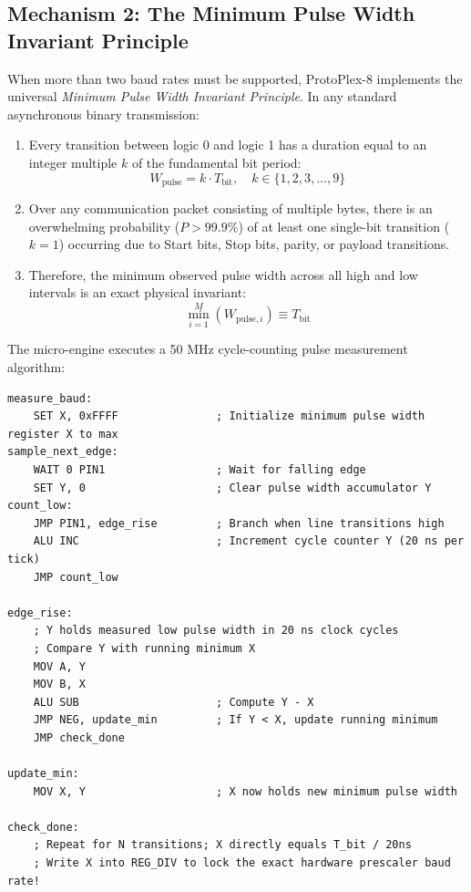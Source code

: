 \documentclass[11pt,a4paper]{article}
\begin{document}
\subsection{Mechanism 2: The Minimum Pulse Width Invariant Principle}
When more than two baud rates must be supported, ProtoPlex-8 implements the universal \textit{Minimum Pulse Width Invariant Principle}. In any standard asynchronous binary transmission:
\begin{enumerate}
    \item Every transition between logic 0 and logic 1 has a duration equal to an integer multiple $k$ of the fundamental bit period:
    \begin{equation}
        W_{\text{pulse}} = k \cdot T_{\text{bit}}, \quad k \in \{1, 2, 3, \dots, 9\}
    \end{equation}
    \item Over any communication packet consisting of multiple bytes, there is an overwhelming probability ($P > 99.9\%$) of at least one single-bit transition ($k=1$) occurring due to Start bits, Stop bits, parity, or payload transitions.
    \item Therefore, the minimum observed pulse width across all high and low intervals is an exact physical invariant:
    \begin{equation}
        \min_{i=1}^{M} \left( W_{\text{pulse}, i} \right) \equiv T_{\text{bit}}
    \end{equation}
\end{enumerate}

The micro-engine executes a 50 MHz cycle-counting pulse measurement algorithm:
\begin{lstlisting}[language={[x86masm]Assembler}, caption={Hardware Minimum Pulse Width Auto-Baud Extraction}]
measure_baud:
    SET X, 0xFFFF               ; Initialize minimum pulse width register X to max
sample_next_edge:
    WAIT 0 PIN1                 ; Wait for falling edge
    SET Y, 0                    ; Clear pulse width accumulator Y
count_low:
    JMP PIN1, edge_rise         ; Branch when line transitions high
    ALU INC                     ; Increment cycle counter Y (20 ns per tick)
    JMP count_low

edge_rise:
    ; Y holds measured low pulse width in 20 ns clock cycles
    ; Compare Y with running minimum X
    MOV A, Y
    MOV B, X
    ALU SUB                     ; Compute Y - X
    JMP NEG, update_min         ; If Y < X, update running minimum
    JMP check_done

update_min:
    MOV X, Y                    ; X now holds new minimum pulse width

check_done:
    ; Repeat for N transitions; X directly equals T_bit / 20ns
    ; Write X into REG_DIV to lock the exact hardware prescaler baud rate!
\end{lstlisting}
\end{document}
